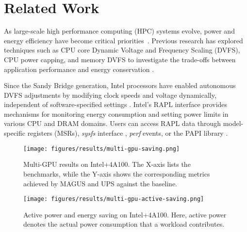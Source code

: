 \section{Related Work}
As large-scale high performance computing (HPC) systems evolve, power and energy efficiency have become critical priorities~\cite{DOE_goal}. 
Previous research has explored techniques such as CPU core Dynamic Voltage and Frequency Scaling (DVFS), CPU power capping, and memory DVFS to investigate the trade-offs between application performance and energy conservation \cite{ramesh2019understanding,walker2018hardware,wallace2016application,bailey2015finding,freeh2005using,ge2007cpu,hsu2005power,lim2006adaptive,rountree2007bounding, DRAM_FREQ, lefurgy2008power,petoumenos2015power,borghesi2015power}. 

Since the Sandy Bridge generation, Intel processors have enabled autonomous DVFS adjustments by modifying clock speeds and voltage dynamically, independent of software-specified settings \cite{intel-p-state,intel-p-state-2,dvfs}. Intel’s RAPL interface provides mechanisms for monitoring energy consumption and setting power limits in various CPU and DRAM domains\cite{david2010rapl,khan2018rapl}. Users can access RAPL data through model-specific registers (MSRs), \textit{sysfs} interface \cite{sysfs}, \textit{perf} \cite{perf} events, or the PAPI library \cite{weaver2012measuring}. 

\begin{figure}
    \centering
    \texttt{[image: figures/results/multi-gpu-saving.png]}
    \caption{Multi-GPU results on Intel+4A100. The X-axis lists the benchmarks, while the Y-axis shows the corresponding metrics achieved by MAGUS and UPS against the baseline.}
    \label{fig:saving_multi_gpu}
    \vspace{-10pt}
\end{figure}

\begin{figure}
    \centering
    \texttt{[image: figures/results/multi-gpu-active-saving.png]}
    \caption{Active power and energy saving on Intel+4A100. Here, active power denotes the actual power consumption that a workload contributes.}
    \label{fig:multi-gpu-active-saving}
    \vspace{-5pt}
\end{figure}

